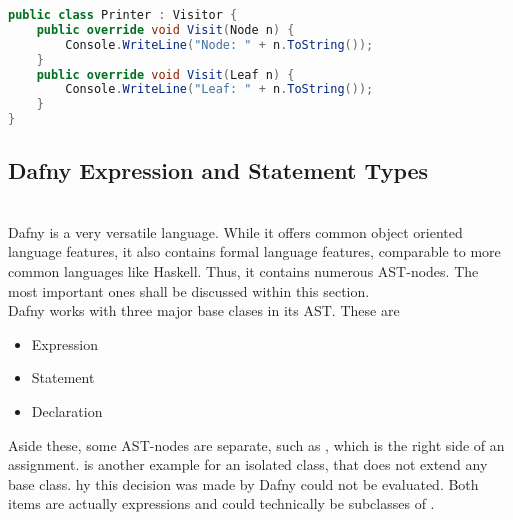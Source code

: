 \begin{lstlisting}[language=csharp, caption={Example for Visitor}, captionpos=b, label={lst:visitor}]
public class Printer : Visitor {
    public override void Visit(Node n) {
        Console.WriteLine("Node: " + n.ToString());
    }
    public override void Visit(Leaf n) {
        Console.WriteLine("Leaf: " + n.ToString());
    }
}
\end{lstlisting}

\subsection{Dafny Expression and Statement Types}
\label{section:analysis_dafnyASTStuff}
\\


Dafny is a very versatile language.
While it offers common object oriented language features, it also contains formal language features, comparable to more common languages like Haskell.
Thus, it contains numerous AST-nodes.
The most important ones shall be discussed within this section.\\

Dafny works with three major base clases in its AST.
These are
\begin{itemize}
    \item Expression
    \item Statement
    \item Declaration
\end{itemize}
Aside these, some AST-nodes are separate, such as , which is the right side of an assignment.
 is another example for an isolated class, that does not extend any base class. 
hy this decision was made by Dafny could not be evaluated.
Both items are actually expressions and could technically be subclasses of .

